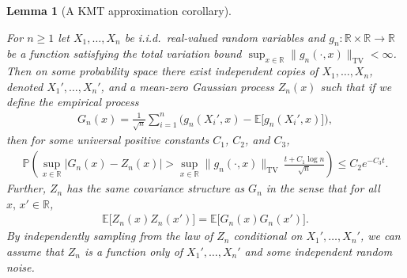 \documentclass[11pt,lof]{puthesis}
\renewcommand{\P}{\ensuremath{\mathbb{P}}}
\newcommand{\R}{\ensuremath{\mathbb{R}}}
\newcommand{\E}{\ensuremath{\mathbb{E}}}
\newcommand{\TV}{\mathrm{TV}}
\theoremstyle{break}
\newtheorem{lemma}{Lemma}[section]
\theoremstyle{proof}
\begin{document}
\begin{lemma}[A KMT approximation corollary]
\label{lem:kernel_app_kmt_corollary}

For $n \geq 1$
let $X_1, \ldots, X_n$
be i.i.d.\ real-valued random variables and
$g_n: \R \times \R \to \R$
be a function satisfying
the total variation bound
$\sup_{x \in \R} \|g_n(\cdot, x)\|_\TV < \infty$.
Then on some probability space
there exist independent copies of
$X_1, \ldots, X_n$,
denoted
$X_1', \ldots, X_n'$,
and a mean-zero Gaussian process $Z_n(x)$
such that if we define
the empirical process
%
\begin{align*}
G_n(x)
= \frac{1}{\sqrt n} \sum_{i=1}^n
\Big(g_n(X_i',x) - \E\big[g_n(X_i',x)\big]\Big),
\end{align*}
%
then
for some universal positive constants
$C_1$, $C_2$, and $C_3$,
%
\begin{align*}
\P\left(
\sup_{x \in \R}
\big|G_n(x) - Z_n(x)\big|
> \sup_{x \in \R} \|g_n(\cdot, x)\|_\TV
\, \frac{t + C_1 \log n}{\sqrt n}
\right)
\leq C_2 e^{-C_3 t}.
\end{align*}
%
Further, $Z_n$
has the same covariance structure as $G_n$
in the sense that for all $x,\, x' \in \R$,
%
\begin{align*}
\E\big[Z_n(x) Z_n(x')\big]
= \E\big[G_n(x) G_n(x')\big].
\end{align*}
%
By independently sampling from the law of
$Z_n$ conditional on $X_1', \ldots, X_n'$,
we can assume that
$Z_n$ is a function only of $X_1', \ldots, X_n'$
and some independent random noise.

\end{lemma}
\end{document}

